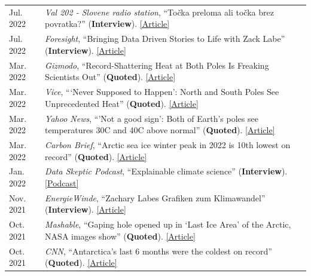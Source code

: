 \documentclass[margin,line,palatino,courier,10pt]{res}
\begin{document}
\begin{resume}
\begin{tabular}{@{}p{0.9in}p{4in}}
Jul. 2022 & \textit{Val 202 - Slovene radio station}, ``To\v{c}ka preloma ali to\v{c}ka brez povratka?'' (\textbf{Interview}). \href{https://val202.rtvslo.si/podkast/vroci-mikrofon/584/174886447}{[Article]}\\
Jul. 2022 & \textit{Foresight}, ``Bringing Data Driven Stories to Life with Zack Labe'' (\textbf{Interview}). \href{https://www.climateforesight.eu/interview/bringing-data-driven-stories-to-life-with-zack-labe/}{[Article]}\\
Mar. 2022 & \textit{Gizmodo}, ``Record-Shattering Heat at Both Poles Is Freaking Scientists Out'' (\textbf{Quoted}). \href{https://gizmodo.com/record-shattering-heat-at-both-poles-is-freaking-scient-1848687193}{[Article]}\\
Mar. 2022 & \textit{Vice}, ```Never Supposed to Happen': North and South Poles See Unprecedented Heat'' (\textbf{Quoted}). \href{https://www.vice.com/en/article/5dg4va/never-supposed-to-happen-north-and-south-poles-see-unprecedented-heat}{[Article]}\\
Mar. 2022 & \textit{Yahoo News}, ``'Not a good sign': Both of Earth’s poles see temperatures 30C and 40C above normal'' (\textbf{Quoted}). \href{https://news.yahoo.com/not-a-good-sign-both-of-earths-poles-see-temperatures-30-c-and-40-c-above-normal-155815110.html}{[Article]}\\
Mar. 2022 & \textit{Carbon Brief}, ``Arctic sea ice winter peak in 2022 is 10th lowest on record'' (\textbf{Quoted}). \href{https://www.carbonbrief.org/arctic-sea-ice-winter-peak-in-2022-is-10th-lowest-on-record}{[Article]}\\
Jan. 2022 & \textit{Data Skeptic Podcast}, ``Explainable climate science'' (\textbf{Interview}). \href{https://dataskeptic.com/blog/episodes/2022/explainable-climate-science}{[Podcast]}\\
Nov. 2021 & \textit{EnergieWinde}, ``Zachary Labes Grafiken zum Klimawandel'' (\textbf{Interview}). \href{https://energiewinde.orsted.de/klimawandel-umwelt/zachary-labe-grafiken-arktis-klimawandel-interview-wissenschaftskommunikation}{[Article]}\\
Oct. 2021 & \textit{Mashable}, ``Gaping hole opened up in `Last Ice Area' of the Arctic, NASA images show'' (\textbf{Quoted}). \href{https://mashable.com/article/arctic-climate-change}{[Article]}\\
Oct. 2021 & \textit{CNN}, ``Antarctica's last 6 months were the coldest on record'' (\textbf{Quoted}). \href{https://www.cnn.com/2021/10/09/weather/weather-record-cold-antarctica-climate-change/index.html}{[Article]}\\

\end{tabular}
\end{resume}
\end{document}
